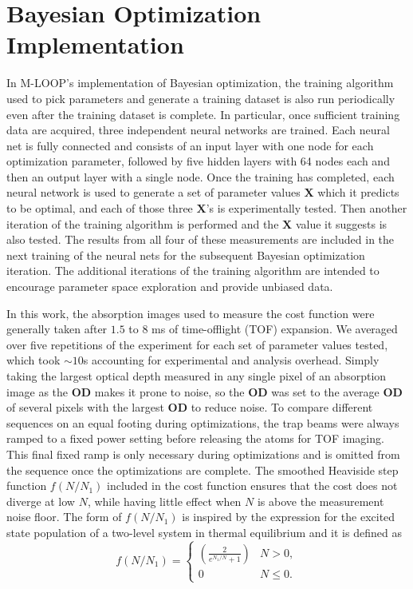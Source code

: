 \documentclass{article}
\begin{document}
\section{Bayesian Optimization Implementation}
\label{sec:bayesian}
In M-LOOP’s implementation of Bayesian optimization, the training algorithm used to pick parameters and generate a training dataset is also run periodically even after the training dataset is complete. In particular, once sufficient training data are acquired, three independent neural networks are trained. Each neural net is fully connected and consists of an input layer with one node for each optimization parameter, followed by five hidden layers with 64 nodes each and then an output layer with a single node. Once the training has completed, each neural network is used to generate a set of parameter values $\mathbf{X}$ which it predicts to be optimal, and each of those three $\mathbf{X}$’s is experimentally tested. Then another iteration of the training algorithm is performed and the $\mathbf{X}$ value it suggests is also tested. The results from all four of these measurements are included in the next training of the neural nets for the subsequent Bayesian optimization iteration. The additional iterations of the training algorithm are intended to encourage parameter space exploration and provide unbiased data.

In this work, the absorption images used to measure the cost function were generally taken after $1.5$ to $8$ ms of time-offlight (TOF) expansion. We averaged over five repetitions of the experiment for each set of parameter values tested, which took $\sim 10$s accounting for experimental and analysis overhead. Simply taking the largest optical depth measured in any single pixel of an absorption image as the $\mathbf{OD}$ makes it prone to noise, so the $\mathbf{OD}$ was set to the average $\mathbf{OD}$ of several pixels with the largest $\mathbf{OD}$ to reduce noise. To compare different sequences on an equal footing during optimizations, the trap beams were always ramped to a fixed power setting before releasing the atoms for TOF imaging. This final fixed ramp is only necessary during optimizations and is omitted from the sequence once the optimizations are complete. The smoothed Heaviside step function $f(N/N_1)$ included in the cost function ensures that the cost does not diverge at low $N$, while having little effect when $N$ is above the measurement noise floor. The form of $f(N/N_1)$ is inspired by the expression for the excited state population of a two-level system in thermal equilibrium and it is defined as
\begin{equation}
    f(N/N_1)= \begin{cases}
        \left( \frac{2}{e^{N_1/N}+1} \right) & N > 0, \\
        0 & N \leq 0.
    \end{cases}
\end{equation}
\end{document}
